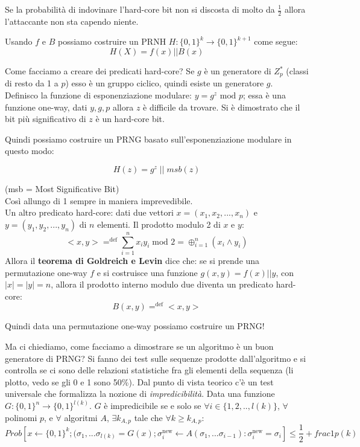 Se la probabilità di indovinare l'hard-core bit non si discosta di molto da $\frac12$ allora l'attaccante non sta capendo niente.

Usando $f$ e $B$ possiamo costruire un PRNH $H:\{0,1\}^k \rightarrow \{0,1\}^{k+1}$ come segue:
\begin{equation*}
H(X) = f(x) || B(x)
\end{equation*}

Come facciamo a creare dei predicati hard-core?
Se $g$ è un generatore di $Z_p^*$ (classi di resto da 1 a $p$) esso è un gruppo ciclico, quindi esiste un generatore $g$. Definisco la funzione di esponenziazione modulare: $y=g^z \text{ mod } p$; essa è una funzione one-way, dati $y, g, p$ allora $z$ è difficile da trovare. Si è dimostrato che il bit più significativo di $z$ è un hard-core bit.

Quindi possiamo costruire un PRNG basato sull'esponenziazione modulare in questo modo:

\begin{equation*}
H(z) = g^z \;||\; msb(z)
\end{equation*}

(msb = Most Significative Bit)\\
Così allungo di 1 sempre in maniera imprevedibile.\\
Un altro predicato hard-core: dati due vettori $x=(x_1, x_2, ..., x_n)$ e $y=(y_1, y_2, ..., y_n)$ di $n$ elementi.
Il prodotto modulo 2 di $x$ e $y$:
\begin{equation*}
<x,y> =^{\text{def}} \sum_{i=1}^nx_iy_i \; \text{mod } 2 = \oplus_{i=1}^n(x_i \land y_i)
\end{equation*}
Allora il \textbf{teorema di Goldreich e Levin} dice che: se si prende una permutazione one-way $f$ e si costruisce una funzione $g(x,y) = f(x) || y$, con $|x| = |y| = n$, allora il prodotto interno modulo due diventa un predicato hard-core:
\begin{equation*}
B(x,y) =^{\text{def}} <x,y>
\end{equation*}

Quindi data una permutazione one-way possiamo costruire un PRNG!

Ma ci chiediamo, come facciamo a dimostrare se un algoritmo è un buon generatore di PRNG? Si fanno dei test sulle sequenze prodotte dall'algoritmo e si controlla se ci sono delle relazioni statistiche fra gli elementi della sequenza (li plotto, vedo se gli 0 e 1 sono 50\%).
Dal punto di vista teorico c'è un test universale che formalizza la nozione di \textit{impredicibilità}.
Data una funzione $G:\{0,1\}^n \rightarrow \{0,1\}^{l(k)}$. $G$ è impredicibile se e solo se $\forall i \in \{1,2,..,l(k)\}$, $\forall$ polinomi $p$, e $\forall$ algoritmi $A$, $\exists k_{A,p}$ tale che $\forall k \geq k_{A,p}:$
\begin{equation*}
Prob[x \leftarrow \{0,1\}^k; (\sigma_1, ...\sigma_{l(k)} = G(x); \sigma^{\text{new}}_i \leftarrow A(\sigma_1,...\sigma_{i-1}) : \sigma^{\text{new}}_i = \sigma_i] \leq \frac12 + frac1{p(k)}
\end{equation*}

